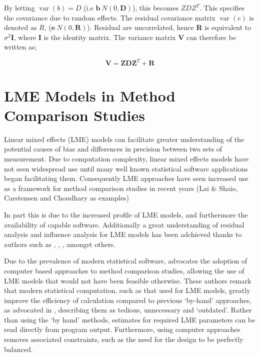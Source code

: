 \documentclass[12pt, a4paper]{report}
\theoremstyle{plain}
\theoremstyle{definition}
\theoremstyle{remark}
\begin{document}
	
	By letting $\operatorname{var}(b) = D$ (i.e $\textbf{b} ~ N(0,\textbf{D})$), this becomes $ZDZ^{T}$. This specifies the covariance due to random
	effects. The residual covariance matrix $\operatorname{var}(e)$ is denoted as $R$, ($\textbf{e} ~ N(0,\textbf{R})$). Residual are uncorrelated,
	hence \textbf{R} is equivalent to $\sigma^{2}$\textbf{I}, where \textbf{I} is the identity matrix. The variance matrix \textbf{V}
	can therefore be written as;
	
	\begin{equation}
	\textbf{V}  = \textbf{ZDZ}^{T} + \textbf{R}
	\end{equation}
	
	


	\section{LME Models in Method Comparison Studies}
	Linear mixed effects (LME) models can facilitate greater understanding of the potential causes of bias and differences in precision between two sets of measurement. Due to computation complexity, linear mixed effects models have not seen widespread use until many well known statistical software applications began facilitating them. Consequently LME approaches have seen increased use as a framework for method comparison studies in recent years (Lai $\&$ Shaio, Carstensen and Choudhary as examples)
	
	
	In part this is due to the increased profile of LME models, and furthermore the availability of capable software. 	Additionally a great understanding of residual analysis and influence analysis for LME models has been adchieved thanks to authors such as \citet{schabenberger}, \citet{Christensen}, \citet{cook86} \citet{west}, amongst others.
	
	
	Due to the prevalence of modern statistical software, \citet{BXC2008} advocates the adoption of computer based approaches to method comparison studies, allowing the use of LME models that would not have been feasible otherwise. These authors remark that modern statistical computation, such as that used for LME models, greatly improve the efficiency of
	calculation compared to previous `by-hand' approaches, as advocated in \citet{BA99}, describing them as tedious, unnecessary and `outdated'. Rather than using the `by hand' methods, estimates for required LME parameters can be read directly from program output. Furthermore, using computer approaches removes associated constraints, such as the need for the design to be perfectly balanced.
	
\end{document}
